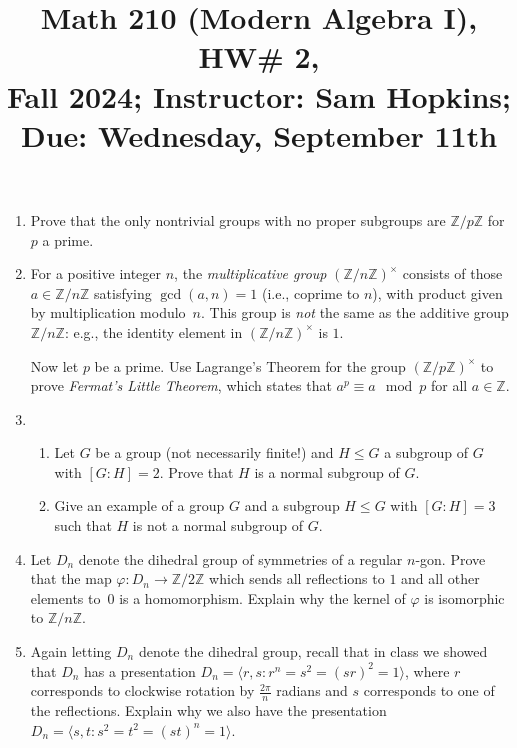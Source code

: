 \documentclass[11pt]{article}
\title{Math 210 (Modern Algebra I), HW\# 2, \\ {\normalsize Fall 2024; Instructor: Sam Hopkins; Due: Wednesday, September 11th}}
\date{}
\begin{document}
\maketitle

\thispagestyle{empty}
\begin{enumerate}

\item Prove that the only nontrivial groups with no proper subgroups are $\mathbb{Z}/p\mathbb{Z}$ for $p$ a prime.

\item For a positive integer $n$, the \emph{multiplicative group} $(\mathbb{Z}/n\mathbb{Z})^\times$ consists of those $a\in \mathbb{Z}/n\mathbb{Z}$ satisfying $\gcd(a,n)=1$ (i.e., coprime to $n$), with product given by multiplication modulo~$n$. This group is \emph{not} the same as the additive group $\mathbb{Z}/n\mathbb{Z}$: e.g., the identity element in $(\mathbb{Z}/n\mathbb{Z})^\times$ is $1$.

Now let $p$ be a prime. Use Lagrange's Theorem for the group $(\mathbb{Z}/p\mathbb{Z})^\times$ to prove \emph{Fermat's Little Theorem}, which states that $a^p \equiv a \mod p$ for all $a\in \mathbb{Z}$.

\item \begin{enumerate}
\item Let $G$ be a group (not necessarily finite!) and $H \leq G$ a subgroup of $G$ with $[G:H]=2$. Prove that $H$ is a normal subgroup of $G$.

\item Give an example of a group $G$ and a subgroup $H \leq G$ with $[G:H]=3$ such that $H$ is not a normal subgroup of $G$.
\end{enumerate}

\item Let $D_n$ denote the dihedral group of symmetries of a regular $n$-gon. Prove that the map $\varphi\colon D_n \to \mathbb{Z}/2\mathbb{Z}$ which sends all reflections to $1$ and all other elements to~$0$ is a homomorphism. Explain why the kernel of $\varphi$ is isomorphic to $\mathbb{Z}/n\mathbb{Z}$.

\item Again letting $D_n$ denote the dihedral group, recall that in class we showed that $D_n$ has a presentation $D_n = \langle r,s \colon r^n = s^2 = (sr)^2=1\rangle$, where $r$ corresponds to clockwise rotation by $\frac{2\pi}{n}$ radians and $s$ corresponds to one of the reflections. Explain why we also have the presentation $D_n = \langle s,t \colon s^2 = t^2 = (st)^n = 1\rangle$.



\end{enumerate}
\end{document}
